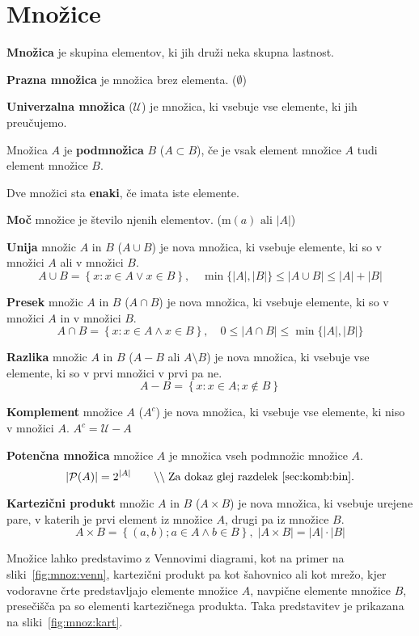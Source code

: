 \documentclass[a4paper,oneside,12pt,fleqn]{article}
\newcommand\krat\cdot
\newcommand{\comment}[1]{\ensuremath{\qquad\backslash\backslash\;}\textnormal{#1}}
\numberwithin{equation}{section}
\begin{document}
\section{Množice}
\label{sec:mnozice}
\textbf{Množica} je skupina elementov, ki jih druži neka skupna lastnost.

\textbf{Prazna množica} je množica brez elementa. ($\emptyset$)

\textbf{Univerzalna množica} ($\mathcal{U}$) je množica, ki vsebuje vse elemente, ki jih preučujemo.

Množica $A$ je \textbf{podmnožica} $B$ ($A \subset B$), če je vsak element množice $A$ tudi element
množice $B$.

Dve množici sta \textbf{enaki}, če imata iste elemente.

\textbf{Moč} množice je število njenih elementov. ($\text{m}(a) \text{ ali } |A|$)

\textbf{Unija} množic $A$ in $B$ ($A \cup B$) je nova množica, ki vsebuje elemente, ki so v množici $A$ ali v
množici $B$. \[ A \cup B = \left\{x:x \in A \lor x \in B \right\}, \quad \min\{|A|, |B|\} \le |A \cup B| \le |A| + |B| \]

\textbf{Presek} množic $A$ in $B$ ($A \cap B$) je nova množica, ki vsebuje elemente, ki so v množici $A$ in v
množici $B$. \[ A \cap B = \left\{x:x \in A \land x \in B \right\}, \quad 0 \le |A \cap B|
\le \min\{|A|, |B|\} \]

\textbf{Razlika} množic $A$ in $B$ ($A - B$ ali $A \setminus B$) je nova množica, ki
vsebuje vse elemente, ki so v prvi množici v prvi pa ne.
\[ A - B = \left\{x : x \in A; x \notin B \right\} \]

\textbf{Komplement} množice $A$ ($A^c$) je nova množica, ki vsebuje vse elemente, ki niso
v množici $A$. $A^c = \mathcal{U} - A$

\textbf{Potenčna množica} množice $A$ je množica vseh podmnožic množice $A$.
\[ |\mathcal{P}(A)| = 2^{|A|} \comment{Za dokaz glej razdelek~\ref{sec:komb:bin}.} \]

\textbf{Kartezični produkt} množic $A$ in $B$ ($A \times B$) je nova množica, ki vsebuje urejene pare, v katerih
je prvi element iz množice $A$, drugi pa iz množice $B$.
\[ A \times B = \left\{ \left(a, b \right); a \in A \land b \in B \right\}, \; \left|A \times B \right| = \left|A\right|
\krat \left|B\right| \]

Množice lahko predstavimo z Vennovimi diagrami, kot na primer na
sliki~\ref{fig:mnoz:venn}, kartezični produkt pa kot šahovnico ali kot mrežo, kjer vodoravne črte
predstavljajo elemente množice $A$, navpične elemente množice $B$, presečišča pa so
elementi kartezičnega produkta. Taka predstavitev je prikazana na
sliki~\ref{fig:mnoz:kart}.
\end{document}
